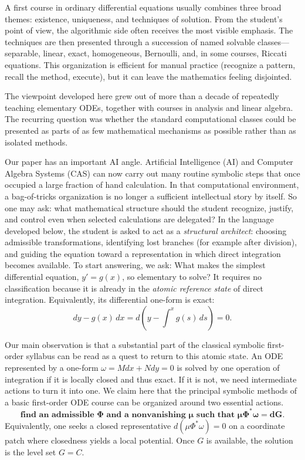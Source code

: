 \documentclass[11pt]{article}
\theoremstyle{definition}
\begin{document}
A first course in ordinary differential equations usually combines three broad themes: existence, uniqueness, and techniques of solution. From the student's point of view, the algorithmic side often receives the most visible emphasis. The techniques are then presented through a succession of named solvable classes---separable, linear, exact, homogeneous, Bernoulli, and, in some courses, Riccati equations. This organization is efficient for manual practice (recognize a pattern, recall the method, execute), but it can leave the mathematics feeling disjointed.

The viewpoint developed here grew out of more than a decade of repeatedly teaching elementary ODEs, together with courses in analysis and linear algebra. The recurring question was whether the standard computational classes could be presented as parts of as few mathematical mechanisms as possible rather than as isolated methods.

Our paper has an important AI angle. Artificial Intelligence (AI) and Computer Algebra Systems (CAS) can now carry out many routine symbolic steps that once occupied a large fraction of hand calculation. In that computational environment, a bag-of-tricks organization \cite{Yap2010} is no longer a sufficient intellectual story by itself. So one may ask: what mathematical structure should the student recognize, justify, and control even when selected calculations are delegated? In the language developed below, the student is asked to act as a \emph{structural architect}: choosing admissible transformations, identifying lost branches (for example after division), and guiding the equation toward a representation in which direct integration becomes available. To start answering, we ask:
What makes the simplest differential equation, \(y'=g(x)\), so elementary to solve? It requires no classification because it is already in the \emph{atomic reference state} of direct integration. Equivalently, its differential one-form is exact:
\[
dy-g(x)\,dx = d\left(y-\int^x g(s)\,ds\right)=0.
\]

Our main observation is that a substantial part of the classical symbolic first-order syllabus can be read as a quest to return to this atomic state. An ODE represented by a one-form $\omega=Mdx+Ndy=0$ is solved by one operation of integration if it is locally closed and thus exact. If it is not, we need intermediate actions to turn it into one. We claim here that the principal symbolic methods of a basic first-order ODE course can be organized around two essential actions.
\[
\boldsymbol{\text{find an admissible }\Phi\text{ and a nonvanishing }\mu\text{ such that }\mu\Phi^*\omega=dG.}
\]
Equivalently, one seeks a closed representative \(d(\mu\Phi^*\omega)=0\) on a coordinate patch where closedness yields a local potential. Once \(G\) is available, the solution is the level set \(G=C\). 
\end{document}

